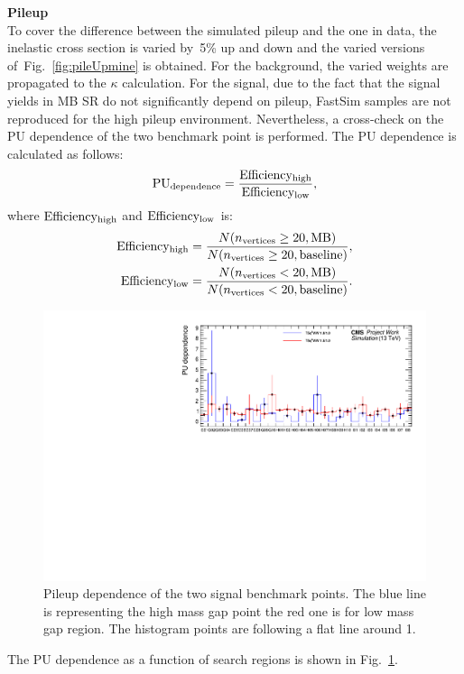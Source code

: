 \textbf{Pileup}\\
To cover the difference between the simulated pileup and the one in data, the inelastic cross section is varied by~5\% up and down and the varied versions of~Fig.~\ref{fig:pileUpmine} is obtained. For the background, the varied weights are propagated to the $\kappa$ calculation. For the signal, due to the fact that the signal yields in MB SR do not significantly depend on pileup, FastSim samples are not reproduced for the high pileup environment. Nevertheless, a cross-check on the PU dependence of the two benchmark point is performed. The PU dependence is calculated as follows:
\begin{equation}
{\rm PU_{dependence}}= \frac{{\rm Efficiency_{high}} }{{\rm Efficiency_{low}} },
\end{equation}
where $\rm Efficiency_{high}$ and $\rm Efficiency_{low}$ is:
\begin{eqnarray}
\label{eff_PU}
{\rm Efficiency_{high}} = \frac{N(n_{\rm vertices}\geq20, {\rm MB})}{N(n_{\rm vertices}\geq20, {\rm baseline})},\nonumber\\
{\rm Efficiency_{low}} = \frac{N(n_{\rm vertices}<20, {\rm MB})}{N(n_{\rm vertices}<20, {\rm baseline})}.
\end{eqnarray}
\begin{figure}[!hbt]
    \begin{center}
 \includegraphics[width=0.8 \textwidth]{Plots/analysis/pileUp/PU_dependence}
  \caption{ \label{fig:pileUpdependence} Pileup dependence of the two signal benchmark points. The blue line is representing the high mass gap point the red one is for low mass gap region. The histogram points are following a flat line around 1.}
  \end{center}
\end{figure}
The PU dependence as a function of search regions is shown in Fig.~\ref{fig:pileUpdependence}. 
